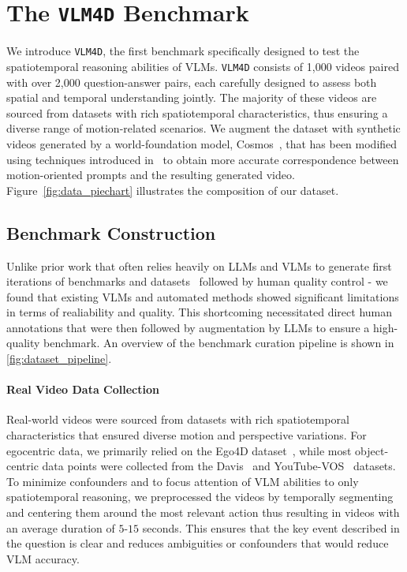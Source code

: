 \section{The \texttt{VLM4D} Benchmark}
We introduce \texttt{VLM4D}, the first benchmark specifically designed to test the spatiotemporal reasoning abilities of VLMs. \texttt{VLM4D} consists of 1,000 videos paired with over 2,000 question-answer pairs, each carefully designed to assess both spatial and temporal understanding jointly. The majority of these videos are sourced from datasets with rich spatiotemporal characteristics, thus ensuring a diverse range of motion-related scenarios. We augment the dataset with synthetic videos generated by a world-foundation model, Cosmos~\cite{agarwal2025cosmos}, that has been modified using techniques introduced in~\cite{he2024mojito} to obtain more accurate correspondence between motion-oriented prompts and the resulting generated video. Figure~\ref{fig:data_piechart} illustrates the composition of our dataset.

\subsection{Benchmark Construction}
Unlike prior work that often relies heavily on LLMs and VLMs to generate first iterations of benchmarks and datasets~\cite{chen2024sharegpt4video} followed by human quality control - we found that existing VLMs and automated methods showed significant limitations in terms of realiability and quality. This shortcoming necessitated direct human annotations that were then followed by augmentation by LLMs to ensure a high-quality benchmark. An overview of the benchmark curation pipeline is shown in \cref{fig:dataset_pipeline}. 

\paragraph{Real Video Data Collection} Real-world videos were sourced from datasets with rich spatiotemporal characteristics that ensured diverse motion and perspective variations. For egocentric data, we primarily relied on the Ego4D dataset~\cite{grauman2022ego4d}, while most object-centric data points were collected from the Davis~\cite{davis2017} and YouTube-VOS~\cite{xu2018youtube} datasets. To minimize confounders and to focus attention of VLM abilities to only spatiotemporal reasoning, we preprocessed the videos by temporally segmenting and centering them around the most relevant action thus resulting in videos with an average duration of $5$-$15$ seconds. This ensures that the key event described in the question is clear and reduces ambiguities or confounders that would reduce VLM accuracy. 

